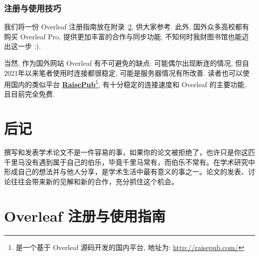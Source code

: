 \documentclass{formatBook}
\begin{document}
\subsection{注册与使用技巧}
我们将一份 Overleaf 注册指南放在附录~\ref{overleafGuide}, 供大家参考. 此外, 国外众多高校都有购买 Overleaf Pro, 提供更加丰富的合作与同步功能, 不知何时我财图书馆也能迈出这一步 :).

当然, 作为国外网站 Overleaf 有不可避免的缺点: 可能偶尔出现断连的情况, 但自2021年以来笔者使用时连接都很稳定, 可能是服务器情况有所改善. 读者也可以使用国内的类似平台 \textbf{\href{http://raisepub.com/}{RaisePub}}\footnote{是一个基于 Overleaf 源码开发的国内平台, 地址为: \url{http://raisepub.com/}}, 有十分稳定的连接速度和 Overleaf 的主要功能, 且目前完全免费.

\chapter{后记}
撰写和发表学术论文不是一件容易的事，如果你的论文被拒绝了，也许只是你这匹千里马没有遇到属于自己的伯乐，毕竟千里马常有，而伯乐不常有。在学术研究中形成自己的想法并与他人分享，是学术生活中最有意义的事之一。论文的发表、讨论往往会带来新的见解和新的合作，充分抓住这个机会。

\printbibliography
\appendix
\chapter{Overleaf 注册与使用指南}\label{overleafGuide}

\end{document}
